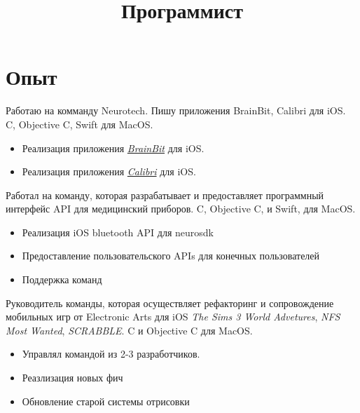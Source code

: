 \documentclass[11pt,a4paper,russian]{moderncv}
\title{Программист}                               %
\def\cplusplus{C\raisebox{0.4ex}{\tiny\textbf{++}}}
\begin{document}
\makecvtitle

\section{Опыт}
{
Работаю на комманду Neurotech. Пишу приложения BrainBit, Calibri для iOS.\newline{} \cplusplus{}, Objective C, Swift для MacOS. 
\begin{itemize}
\item Реализация приложения \href{https://apps.apple.com/us/app/brainbit-app/id1510548623}{\textit{BrainBit}} для iOS.
\item Реализация приложения \href{https://apps.apple.com/ru/app/motion-assistant/id1269581635}{\textit{Calibri}} для iOS.
\end{itemize}
\hfill{ }\newline{}
}

{
Работал на команду, которая разрабатывает и предоставляет программный \newline{} интерфейс API для медицинский приборов.\newline{} \cplusplus{}, Objective C, и Swift, для MacOS. 
\begin{itemize}
\item Реализация iOS bluetooth API для neurosdk
\item Предоставление пользовательского APIs для конечных пользователей
\item Поддержка команд 
\end{itemize}
\hfill{ }\newline{}
}

{
Руководитель команды, которая осуществляет  рефакторинг и\newline{} сопровождение мобильных игр от Electronic Arts для iOS\newline{} \textit{The Sims 3 World Advetures}, \textit{NFS Most Wanted},\newline{} \textit{SCRABBLE}.\newline{} \cplusplus{} и Objective C для MacOS.\newline{}
\begin{itemize}
\item Управлял командой из 2-3 разработчиков.
\item Реазлизация новых фич
\item Обновление старой системы отрисовки
\end{itemize}
}
\end{document}
